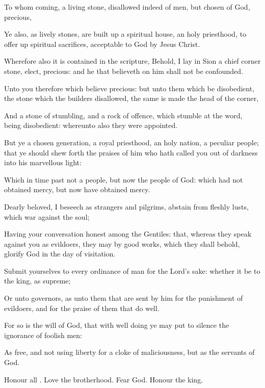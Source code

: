 {To
whom
coming,
{} a
living
stone,
disallowed
indeed
of
men,
but
chosen
of
God,
{}
precious,

Ye
also,
as
lively
stones, are built
up a
spiritual
house, an
holy
priesthood, to offer
up
spiritual
sacrifices,
acceptable to
God
by
Jesus
Christ.

Wherefore
also it is
contained
in the
scripture,
Behold, I
lay
in
Sion a chief
corner
stone,
elect,
precious:
and he that
believeth
on
him
shall
not be
confounded.

Unto
you
therefore
which
believe
{}
precious:
but unto them which be
disobedient, the
stone
which the
builders
disallowed, the
same is
made the
head of the
corner,

And a
stone of
stumbling,
and a
rock of
offence,
{}
which stumble
at the
word, being
disobedient:
whereunto
also they were
appointed.

But
ye
{} a
chosen
generation, a
royal
priesthood, an
holy
nation, a
peculiar
people;
that ye should shew
forth the
praises of him who hath
called
you out
of
darkness
into
his
marvellous
light:

Which in time
past
{}
not a
people,
but
{}
now the
people of
God:
which
had
not obtained
mercy,
but
now have obtained
mercy.


\par }{\PP {}Dearly
beloved, I
beseech
{}
as
strangers
and
pilgrims,
abstain from
fleshly
lusts,
which
war
against the
soul;

Having
your
conversation
honest
among the
Gentiles:
that,
whereas they speak
against
you
as
evildoers, they
may
by
{}
good
works, which they shall
behold,
glorify
God
in the
day of
visitation.


\par }{\PP {}Submit
yourselves to
every
ordinance of
man
for the
Lord’s sake: whether it
be to the
king,
as
supreme;

Or unto
governors,
as unto them that are
sent
by
him
for the
punishment of
evildoers,
and for the
praise of them that do
well.

For
so
is the
will of
God, that with well
doing ye may put to
silence the
ignorance of
foolish
men:

As
free,
and
not
using
{}
liberty
for a
cloke of
maliciousness,
but
as the
servants of
God.

Honour
all
{}.
Love the
brotherhood.
Fear
God.
Honour the
king.

}
